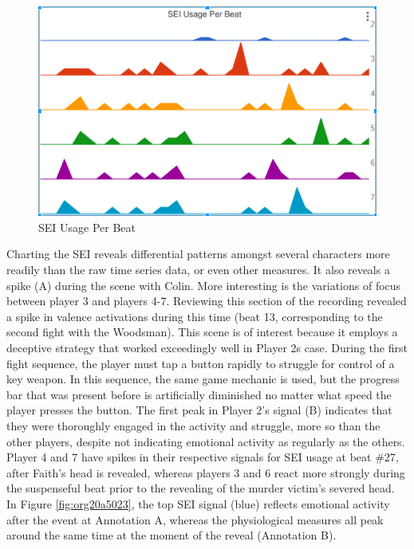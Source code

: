 \begin{figure}[htbp]
\centering
\includegraphics[width=.9\linewidth]{figures/Fig4.PNG}
\caption{\label{fig:org20e409f}
SEI Usage Per Beat}
\end{figure} Charting the SEI reveals differential patterns
amongst several characters more readily than the raw time series data,
or even other measures. It also reveals a spike (A) during the scene
with Colin. More interesting is the variations of focus between player
3 and players 4-7. Reviewing this section of the recording revealed a
spike in valence activations during this time (beat 13, corresponding
to the second fight with the Woodsman). This scene is of interest
because it employs a deceptive strategy that worked exceedingly well
in Player 2s case. During the first fight sequence, the player must
tap a button rapidly to struggle for control of a key weapon. In this
sequence, the same game mechanic is used, but the progress bar that
was present before is artificially diminished no matter what speed the
player presses the button. The first peak in Player 2's signal (B)
indicates that they were thoroughly engaged in the activity and
struggle, more so than the other players, despite not indicating
emotional activity as regularly as the others.  Player 4 and 7 have
spikes in their respective signals for SEI usage at beat \#27, after
Faith's head is revealed, whereas players 3 and 6 react more strongly
during the suspenseful beat prior to the revealing of the murder
victim's severed head. In Figure \ref{fig:org20a5023}, the top SEI
signal (blue) reflects emotional activity after the event at Annotation A,
whereas the physiological measures all peak around the same time at
the moment of the reveal (Annotation B).

